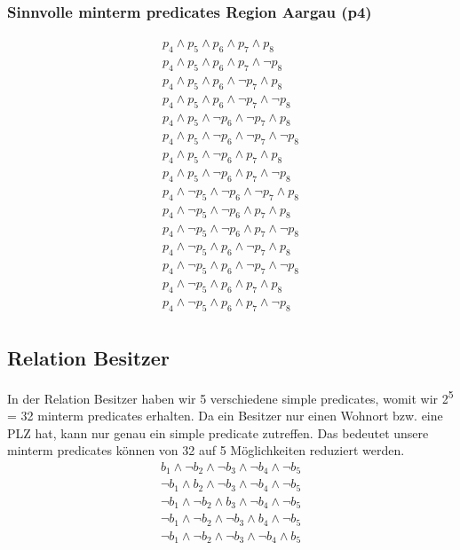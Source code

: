\documentclass[11pt,a4paper,parskip=half]{scrartcl}
\begin{document}
\subsubsection{Sinnvolle minterm predicates Region Aargau (p4)}
\begin{align*}
p_4 \wedge p_5 \wedge p_6 \wedge p_7 \wedge p_8\\
p_4 \wedge p_5 \wedge p_6 \wedge p_7 \wedge \neg p_8\\
p_4 \wedge p_5 \wedge p_6 \wedge \neg p_7 \wedge p_8\\
p_4 \wedge p_5 \wedge p_6 \wedge \neg p_7 \wedge \neg p_8\\
p_4 \wedge p_5 \wedge \neg p_6 \wedge \neg p_7 \wedge p_8\\
p_4 \wedge p_5 \wedge \neg p_6 \wedge \neg p_7 \wedge \neg p_8\\
p_4 \wedge p_5 \wedge \neg p_6 \wedge  p_7 \wedge p_8\\
p_4 \wedge p_5 \wedge \neg p_6 \wedge  p_7 \wedge \neg p_8\\
p_4 \wedge \neg p_5 \wedge \neg p_6 \wedge \neg p_7 \wedge p_8\\
p_4 \wedge \neg p_5 \wedge \neg p_6 \wedge  p_7 \wedge p_8\\
p_4 \wedge \neg p_5 \wedge \neg p_6 \wedge  p_7 \wedge \neg p_8\\
p_4 \wedge \neg p_5 \wedge  p_6 \wedge \neg p_7 \wedge p_8\\
p_4 \wedge \neg p_5 \wedge  p_6 \wedge \neg p_7 \wedge \neg p_8\\
p_4 \wedge \neg p_5 \wedge  p_6 \wedge  p_7 \wedge  p_8\\
p_4 \wedge \neg p_5 \wedge  p_6 \wedge  p_7 \wedge \neg p_8\\
\end{align*}


\subsection{Relation Besitzer}
In der Relation Besitzer haben wir 5 verschiedene simple predicates, womit wir 2\textsuperscript{5} = 32 minterm predicates erhalten. Da ein Besitzer nur einen Wohnort bzw. eine PLZ hat, kann nur genau ein simple predicate zutreffen. Das bedeutet unsere minterm predicates können von 32 auf 5 Möglichkeiten reduziert werden.
\begin{align*}
b_1 \wedge \neg b_2 \wedge \neg b_3 \wedge \neg b_4 \wedge \neg b_5\\
\neg b_1 \wedge  b_2 \wedge \neg b_3 \wedge \neg b_4 \wedge \neg b_5\\
\neg b_1 \wedge \neg b_2 \wedge  b_3 \wedge \neg b_4 \wedge \neg b_5\\
\neg b_1 \wedge \neg  b_2 \wedge \neg b_3 \wedge  b_4 \wedge \neg b_5\\
\neg b_1 \wedge \neg b_2 \wedge \neg b_3 \wedge \neg b_4 \wedge b_5\\
\end{align*}
\end{document}
